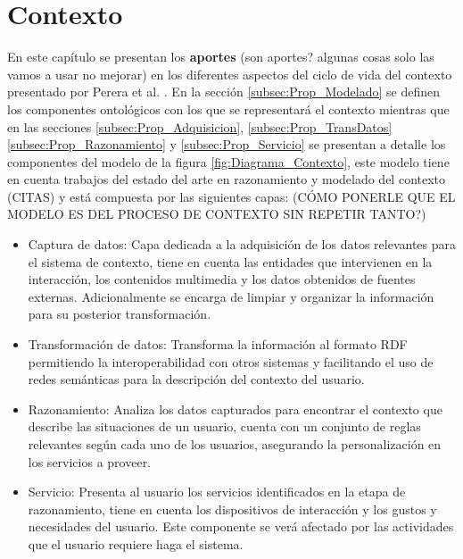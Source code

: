 \section{Contexto}
\label{sec:Prop_Contexto}

En este capítulo se presentan los \textbf{aportes} (son aportes? algunas cosas solo las vamos a usar no mejorar) en los diferentes aspectos del ciclo de vida del contexto presentado por Perera et al. \cite{Perera2014}. En la sección \ref{subsec:Prop_Modelado} se definen los componentes ontológicos con los que se representará el contexto mientras que en las secciones \ref{subsec:Prop_Adquisicion}, \ref{subsec:Prop_TransDatos} \ref{subsec:Prop_Razonamiento} y \ref{subsec:Prop_Servicio} se presentan a detalle los componentes del modelo de la figura \ref{fig:Diagrama_Contexto}, este modelo tiene en cuenta trabajos del estado del arte en razonamiento y modelado del contexto (CITAS) y está compuesta por las siguientes capas: (CÓMO PONERLE QUE EL MODELO ES DEL PROCESO DE CONTEXTO SIN REPETIR TANTO?)

\begin{itemize}
    \item Captura de datos: Capa dedicada a la adquisición de los datos relevantes para el sistema de contexto, tiene en cuenta las entidades que intervienen en la interacción, los contenidos multimedia y los datos obtenidos de fuentes externas. Adicionalmente se encarga de limpiar y organizar la información para su posterior transformación.
    \item Transformación de datos: Transforma la información al formato RDF permitiendo la interoperabilidad con otros sistemas y facilitando el uso de redes semánticas para la descripción del contexto del usuario.
    \item Razonamiento: Analiza los datos capturados para encontrar el contexto que describe las situaciones de un usuario, cuenta con un conjunto de reglas relevantes según cada uno de los usuarios, asegurando la personalización en los servicios a proveer.
    \item Servicio: Presenta al usuario los servicios identificados en la etapa de razonamiento, tiene en cuenta los dispositivos de interacción y los gustos y necesidades del usuario. Este componente se verá afectado por las actividades que el usuario requiere haga el sistema.
\end{itemize}


